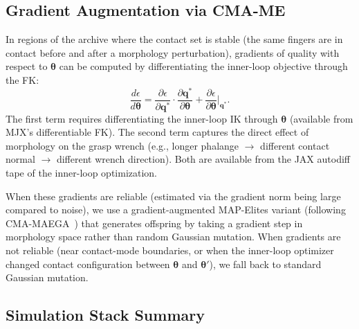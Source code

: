 \documentclass[journal]{IEEEtran}
\newcommand{\btheta}{\boldsymbol{\theta}}
\newcommand{\bq}{\mathbf{q}}
\newcommand{\eps}{\epsilon}
\begin{document}
\subsection{Gradient Augmentation via CMA-ME}
\label{sec:cmame}

In regions of the archive where the contact set is stable (the same fingers are in contact
before and after a morphology perturbation), gradients of quality with respect to $\btheta$
can be computed by differentiating the inner-loop objective through the FK:
\begin{equation}
  \frac{d\eps}{d\btheta} = \frac{\partial \eps}{\partial \bq^*}
  \cdot \frac{\partial \bq^*}{\partial \btheta}
  + \frac{\partial \eps}{\partial \btheta}\bigg|_{\bq^*}.
  \label{eq:morphgrad}
\end{equation}
The first term requires differentiating the inner-loop IK through $\btheta$ (available
from MJX's differentiable FK).
The second term captures the direct effect of morphology on the grasp wrench (e.g.,
longer phalange $\to$ different contact normal $\to$ different wrench direction).
Both are available from the JAX autodiff tape of the inner-loop optimization.

When these gradients are reliable (estimated via the gradient norm being large compared
to noise), we use a gradient-augmented MAP-Elites variant (following CMA-MAEGA~\cite{cmamae2022})
that generates offspring by taking a gradient step in morphology space rather than random
Gaussian mutation.
When gradients are not reliable (near contact-mode boundaries, or when the inner-loop
optimizer changed contact configuration between $\btheta$ and $\btheta'$), we fall back
to standard Gaussian mutation.

\subsection{Simulation Stack Summary}
\end{document}
